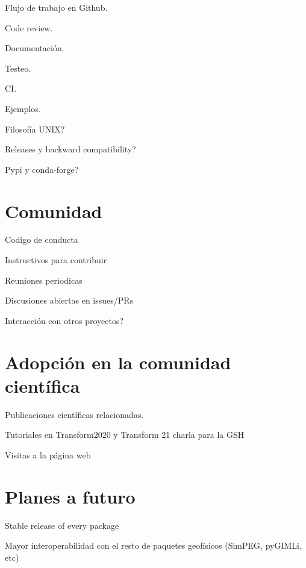 Flujo de trabajo en Github.

Code review.

Documentación.

Testeo.

CI.

Ejemplos.

Filosofía UNIX?

Releases y backward compatibility?

Pypi y conda-forge?


\section{Comunidad}

Codigo de conducta

Instructivos para contribuir

Reuniones periodicas

Discusiones abiertas en issues/PRs

Interacción con otros proyectos?


\section{Adopción en la comunidad científica}

Publicaciones científicas relacionadas.

Tutoriales en Transform2020 y Transform 21 charla para la GSH

Visitas a la página web


\section{Planes a futuro}

Stable release of every package

Mayor interoperabilidad con el resto de paquetes geofísicos (SimPEG, pyGIMLi, etc)
